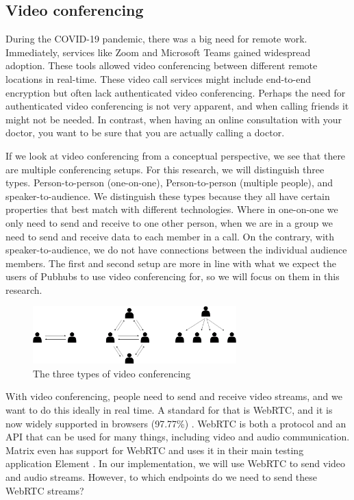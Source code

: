 \documentclass{report}
\theoremstyle{definition}
\theoremstyle{remark}
\begin{document}
\subsection{Video conferencing}
During the COVID-19 pandemic, there was a big need for remote work. Immediately, services like Zoom \cite{Zoom}  and Microsoft Teams  \cite{MSTeams} gained widespread adoption. These tools allowed video conferencing between different remote locations in real-time. These video call services might include end-to-end encryption but often lack authenticated video conferencing. Perhaps the need for authenticated video conferencing is not very apparent, and when calling friends it might not be needed. In contrast, when having an online consultation with your doctor, you want to be sure that you are actually calling a doctor.


If we look at video conferencing from a conceptual perspective, we see that there are multiple conferencing setups. For this research, we will distinguish three types. Person-to-person (one-on-one), Person-to-person (multiple people), and speaker-to-audience. We distinguish these types because they all have certain properties that best match with different technologies. Where in one-on-one we only need to send and receive to one other person, when we are in a group we need to send and receive data to each member in a call. On the contrary, with speaker-to-audience, we do not have connections between the individual audience members. The first and second setup are more in line with what we expect the users of Pubhubs to use video conferencing for, so we will focus on them in this research. 

\begin{figure}[!hbt]
    \centering
    \includegraphics[width=0.7\textwidth]{Research proposal/img/three types.drawio.png}
    \caption{The three types of video conferencing}
    \label{fig:enter-label}
\end{figure}

With video conferencing, people need to send and receive video streams, and we want to do this ideally in real time. A standard for that is WebRTC, and it is now widely supported in browsers (97.77\%) \cite{CIUIWEBRTC}. WebRTC is both a protocol and an API that can be used for many things, including video and audio communication. Matrix even has support for WebRTC and uses it in their main testing application Element \cite{ELEMENT}. In our implementation, we will use WebRTC to send video and audio streams. However, to which endpoints do we need to send these WebRTC streams?
\end{document}
